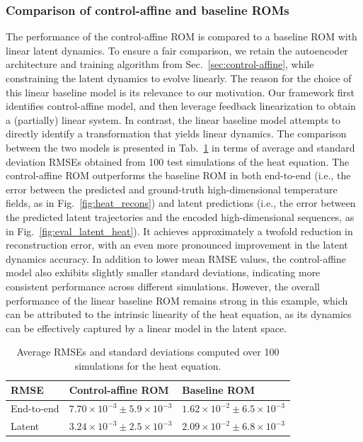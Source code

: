 \documentclass{article}
\begin{document}
\subsubsection{Comparison of control-affine and baseline ROMs}
The performance of the control-affine ROM is compared to a baseline ROM with linear latent dynamics.
To ensure a fair comparison, we retain the autoencoder architecture and training algorithm from Sec.~\ref{sec:control-affine}, while constraining the latent dynamics to evolve linearly.
The reason for the choice of this linear baseline model is its relevance to our motivation.
Our framework first identifies control-affine model, and then leverage feedback linearization to obtain a (partially) linear system.
In contrast, the linear baseline model attempts to directly identify a transformation that yields linear dynamics.
The comparison between the two models is presented in Tab.~\ref{tab:comp-heat} in terms of average and standard deviation RMSEs obtained from 100 test simulations of the heat equation.
The control-affine ROM outperforms the baseline ROM in both end-to-end (i.e., the error between the predicted and ground-truth high-dimensional temperature fields, as in Fig.~\ref{fig:heat_recons}) and latent predictions (i.e., the error between the predicted latent trajectories and the encoded high-dimensional sequences, as in Fig.~\ref{fig:eval_latent_heat}).
It achieves approximately a twofold reduction in reconstruction error, with an even more pronounced improvement in the latent dynamics accuracy.
In addition to lower mean RMSE values, the control-affine model also exhibits slightly smaller standard deviations, indicating more consistent performance across different simulations.
However, the overall performance of the linear baseline ROM remains strong in this example, which can be attributed to the intrinsic linearity of the heat equation, as its dynamics can be effectively captured by a linear model in the latent space.
\begin{table}[ht]
\centering
\caption{Average RMSEs and standard deviations computed over 100 simulations for the heat equation.}
\label{tab:comp-heat}
\begin{tabular}{lll}
\hline
 RMSE & Control-affine ROM & Baseline ROM \\
\hline
End-to-end  & $7.70 \times 10^{-3} \pm 5.9\times10^{-3}$ & $1.62 \times 10^{-2} \pm 6.5\times10^{-3}$ \\
Latent  & $3.24\times 10^{-3} \pm 2.5\times10^{-3}$ & $2.09 \times 10^{-2} \pm 6.8\times10^{-3}$ \\
\hline
\end{tabular}
\end{table}
\end{document}
